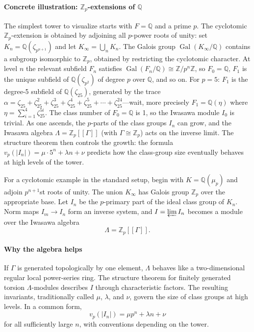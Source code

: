 \paragraph{Concrete illustration: $\mathbb Z_p$-extensions of $\mathbb Q$}
The simplest tower to visualize starts with $F=\mathbb Q$ and a prime $p$. The cyclotomic $\mathbb Z_p$-extension is obtained by adjoining all $p$-power roots of unity: set $K_n=\mathbb Q(\zeta_{p^{n+1}})$ and let $K_\infty=\bigcup_n K_n$. The Galois group $\operatorname{Gal}(K_\infty/\mathbb Q)$ contains a subgroup isomorphic to $\mathbb Z_p$, obtained by restricting the cyclotomic character. At level $n$ the relevant subfield $F_n$ satisfies $\operatorname{Gal}(F_n/\mathbb Q)\cong\mathbb Z/p^n\mathbb Z$, so $F_0=\mathbb Q$, $F_1$ is the unique subfield of $\mathbb Q(\zeta_{p^2})$ of degree $p$ over $\mathbb Q$, and so on. For $p=5$: $F_1$ is the degree-5 subfield of $\mathbb Q(\zeta_{25})$, generated by the trace $\alpha=\zeta_{25}+\zeta_{25}^2+\zeta_{25}^3+\zeta_{25}^4+\zeta_{25}^5+\cdots+\zeta_{25}^{24}$---wait, more precisely $F_1=\mathbb Q(\eta)$ where $\eta=\sum_{i=1}^{4}\zeta_{25}^{5i}$. The class number of $F_0=\mathbb Q$ is 1, so the Iwasawa module $I_0$ is trivial. As one ascends, the $p$-parts of the class groups $I_n$ can grow, and the Iwasawa algebra $\Lambda=\mathbb Z_p[[\Gamma]]$ (with $\Gamma\cong\mathbb Z_p$) acts on the inverse limit. The structure theorem then controls the growth: the formula $v_p(|I_n|)=\mu\cdot 5^n+\lambda n+\nu$ predicts how the class-group size eventually behaves at high levels of the tower.

For a cyclotomic example in the standard setup, begin with $K=\mathbb Q(\mu_p)$ and adjoin $p^{n+1}$st roots of unity. The union $K_\infty$ has Galois group $\mathbb Z_p$ over the appropriate base. Let $I_n$ be the $p$-primary part of the ideal class group of $K_n$. Norm maps $I_m\to I_n$ form an inverse system, and $I=\varprojlim I_n$ becomes a module over the Iwasawa algebra
\[
\Lambda=\mathbb Z_p[[\Gamma]].
\]

\paragraph{Why the algebra helps}
If $\Gamma$ is generated topologically by one element, $\Lambda$ behaves like a two-dimensional regular local power-series ring. The structure theorem for finitely generated torsion $\Lambda$-modules describes $I$ through characteristic factors. The resulting invariants, traditionally called $\mu$, $\lambda$, and $\nu$, govern the size of class groups at high levels. In a common form,
\[
v_p(|I_n|)=\mu p^n+\lambda n+\nu
\]
for all sufficiently large $n$, with conventions depending on the tower.

